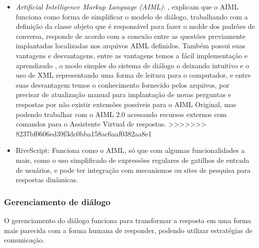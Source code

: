 \documentclass[
	12pt,				%
	oneside,
	a4paper,			%
	english,			%
	french,				%
	spanish,			%
	brazil				%
	]{abntex2}
\begin{document}
\begin{itemize}
	\item \emph{Artificial Intelligence Markup Language (AIML)}: \textcite{AIML}, explicam que o AIML funciona como forma de simplificar o modelo de diálogo, trabalhando com a definição da classe objeto que é responsável para fazer o molde dos padrões de conversa, responde de acordo com a conexão entre as questões previamente implantadas localizadas nos arquivos AIML definidos. Também possui suas vantagens e desvantagens, entre as vantagens temos a fácil implementação e aprendizado , o modo simples do sistema de diálogo o deixando intuitivo e o uso de XML representando uma forma de leitura para o computador, e entre suas desvantagem temos o conhecimento fornecido pelos arquivos, por precisar de atualização manual para implantação de novas perguntas e respostas por não existir extensões possíveis para o AIML Original, mas podendo trabalhar com o AIML 2.0 acessando recursos externos com comandos para o Assistente Virtual de respostas.
>>>>>>> 8237bf0606ed39f3dc0bba158ac6aaf0382aa8e1
	\item RiveScript: Funciona como o AIML, só que com algumas funcionalidades a mais, como o uso simplificado de expressões regulares de gatilhos de entrada de usuários, e pode ter integração com mecanismos ou sites de pesquisa para respostas dinâmicas.
\end{itemize} 

\subsubsection{Gerenciamento de diálogo}
O gerenciamento do diálogo funciona para transformar a resposta em uma forma mais parecida com a forma humana de responder, podendo utilizar estratégias de comunicação.
\end{document}
